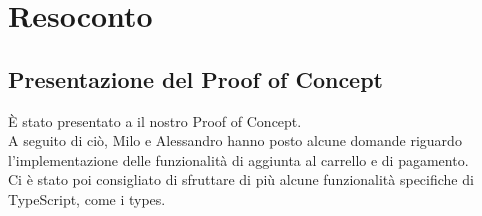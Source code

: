 \section{Resoconto}
\subsection{Presentazione del Proof of Concept}

È stato presentato a \Proponente{} il nostro Proof of Concept. \\A seguito di ciò, Milo e Alessandro hanno posto alcune domande riguardo l'implementazione delle funzionalità di aggiunta al carrello e di pagamento. \\Ci è stato poi consigliato di sfruttare di più alcune funzionalità specifiche di TypeScript, come i types.

